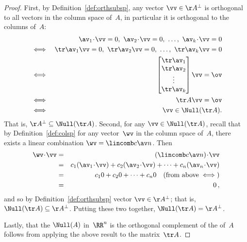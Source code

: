 \begin{proof} 
First, by Definition~\ref{def:orthsubsp}, any vector \(\vv\in\AA^\perp\) is orthogonal to all vectors in the column space of~\(A\), in particular it is orthogonal to the columns of~\(A\):
\begin{eqnarray*}
&& \av_1\cdot\vv=0,\ \av_2\cdot\vv=0,\ \ldots,\ \av_k\cdot\vv=0
\\&\iff& \tr\av_1\vv=0,\ \tr\av_2\vv=0,\ \ldots,\ \tr\av_k\vv=0
\\&\iff&\begin{bmatrix} \tr\av_1\\\tr\av_2\\\vdots\\\tr\av_k \end{bmatrix}\vv=\ov
\\&\iff& \tr A\vv=\ov
\\&\iff&\vv\in\Null(\tr A).
\end{eqnarray*}
That is, \(\AA^\perp\subseteq\Null(\tr A)\).
Second, for any \(\vv\in\Null(\tr A)\),
recall that by Definition~\ref{def:colsp} for any vector~\(\wv\) in the column space of~\(A\), there exists a linear combination \(\wv=\lincomb c\av n\). 
Then
\begin{eqnarray*}
\wv\cdot\vv&=&(\lincomb c\av n)\cdot\vv
\\&=&c_1(\av_1\cdot\vv)+c_2(\av_2\cdot\vv)+\cdots+c_n(\av_n\cdot\vv)
\\&=&c_10+c_20+\cdots+c_n0
\quad(\text{from above}\iff)
\\&=&0\,,
\end{eqnarray*}
and so by Definition~\ref{def:orthsubsp} vector \(\vv\in\AA^\perp\); that is, \(\Null(\tr A)\subseteq\AA^\perp\).
Putting these two together, \(\Null(\tr A)=\AA^\perp\).

Lastly, that the \(\Null(A)\) in~\(\RR^n\) is the orthogonal complement of the  of~\(A\) follows from applying the above result to the matrix~\(\tr A\).
\end{proof}



